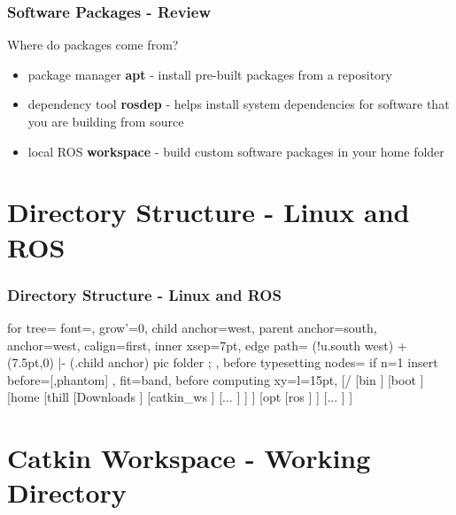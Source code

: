 \documentclass[fleqn]{beamer} %
\newcommand{\sectiontitleI}{Software Packages - Review} %
\newcommand{\sectiontitleII}{Directory Structure - Linux and ROS}
\newcommand{\sectiontitleIII}{Catkin Workspace - Working Directory}
\begin{document}
	\begin{frame}[containsverbatim] \small
		\frametitle{\sectiontitleI}

	Where do packages come from?		
	
	\begin{itemize}
	\item package manager {\bf apt} - install pre-built packages from a repository \vspace{3mm}
	
	\item dependency tool {\bf rosdep} - helps install system dependencies for software that you are building from source \vspace{3mm}
	
	\item local ROS {\bf workspace} - build custom software packages in your home folder \vspace{3mm}				
	\end{itemize}


	\end{frame}

\section{\sectiontitleII}

	\begin{frame}[label=sectionII,containsverbatim] \small
		\frametitle{\sectiontitleII}
		
		\begin{forest}
  	for tree={
    font=\ttfamily,
    grow'=0,
    child anchor=west,
    parent anchor=south,
    anchor=west,
    calign=first,
    inner xsep=7pt,
    edge path={
      \noexpand{}
      (!u.south west) +(7.5pt,0) |- (.child anchor) pic {folder} ;
    },
    before typesetting nodes={
      if n=1
        {insert before={[,phantom]}}
        {}
    },
    fit=band,
    before computing xy={l=15pt},
  	}  
[/
  [bin
  ]
  [boot
  ]
  [home
    [thill
    	[Downloads
    	]
    	[{\BL catkin\_ws}
    	]
    	[...
    	]
    ]
  ]
  [opt
    [ros
    ]
  ]
  [...
  ]
]
\end{forest}
 

\end{frame}

\section{\sectiontitleIII}
\end{document}
